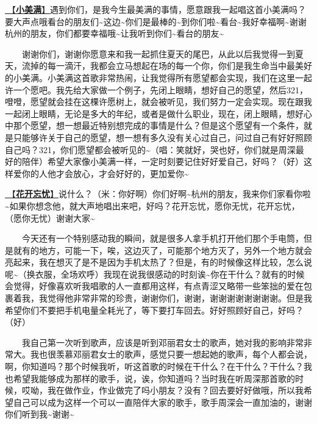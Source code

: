 \documentclass[]{ctexbook}
\begin{document}
\hyperref[happy-ending]{🎵【\textbf{小美满}】}遇到你们，是我今生最美满的事情，愿意跟我一起唱这首小美满吗？要大声点哦看台的朋友们\textasciitilde 这边\textasciitilde 你们是最棒的\textasciitilde 到你们啦\textasciitilde 看台\textasciitilde 我好幸福啊\textasciitilde 谢谢杭州的朋友，你们都要幸福哦\textasciitilde 让我听到你们\textasciitilde 看台的朋友\textasciitilde{}

  谢谢你们，谢谢你愿意来和我一起抓住夏天的尾巴，从此以后我觉得一到夏天，流掉的每一滴汗，我都会立马想起在场的每一个你，你们是我生命当中最美好的小美满。小美满这首歌非常热闹，让我觉得所有愿望都会实现，我们在这里一起许一个愿吧。我先给大家做一个例子，先闭上眼睛，想好自己的愿望，然后321，噔噔，愿望就会挂在这棵许愿树上，就会被听见，我们努力一定会实现。现在跟我一起闭上眼睛，无论是多大的年纪，或者是做什么职业，现在，闭上眼睛，想好心中那个愿望，想一想最近特别想完成的事情是什么？但是这个愿望有一个条件，就是只能够许关于自己的愿望，想一想有多久没有关心过自己，问过自己有好好照顾自己吗？321，你们愿望都会被听见的\textasciitilde（唱：笑就好，哭也好，你们就是周深最好的陪伴）希望大家像小美满一样，一定时刻要记住好好爱自己，好吗？（好）这样爱你的人他才会放心，才会好好的，更加爱你\textasciitilde{}

\hyperref[no-worries]{🎵【\textbf{花开忘忧}】}说什么？（米：你好啊）你们好啊\textasciitilde 杭州的朋友，我来你们家看你啦\textasciitilde 如果你想念他，就大声地唱出来吧，好吗？花开忘忧，愿你无忧，花开忘忧，（愿你无忧）谢谢大家\textasciitilde{}

  今天还有一个特别感动我的瞬间，就是很多人拿手机打开他们那个手电筒，但是就有的地方，可能一下，唉，这边灭了，可能那个地方灭了，另外一个地方就会亮起来，我在想灭了是不是因为手机太热了？但是，有的时候像这样比较，怎么说呢\textasciitilde（换衣服，全场欢呼）我现在说我很感动的时刻诶\textasciitilde 你在干什么？就有的时候会觉得，好像喜欢听我唱歌的人一直都用这样，有点青涩又略带一些笨拙的爱在包裹着我，我觉得他非常非常的珍贵，谢谢你们，谢谢，谢谢谢谢谢谢谢谢。但是我希望你们不要把手机电量全耗光了，等下要打车回去。好好照顾好自己，好吗？（好）

  我自己第一次听到歌声，应该是听到邓丽君女士的歌声，她对我的影响非常非常大。我也很羡慕邓丽君女士的歌声，感觉只要一想起她的歌声，每个人都会说，啊，你知道吗？那个时候我听，听这首歌的时候在干什么？在干什么？干什么？我也希望我能够成为那样的歌手，说，诶，你知道吗？当时我在听周深那首歌的时候，哎呦，我在做作业，作业做完了吗小朋友？没有？回去要好好做哦，所以我希望自己可以成为这样一个可以一直陪伴大家的歌手，歌手周深会一直加油的，谢谢你们听到我\textasciitilde 谢谢\textasciitilde{}
\end{document}
